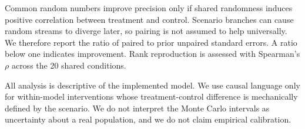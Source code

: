 Common random numbers improve precision only if shared randomness induces positive correlation between treatment and control. Scenario branches can cause random streams to diverge later, so pairing is not assumed to help universally. We therefore report the ratio of paired to prior unpaired standard errors. A ratio below one indicates improvement. Rank reproduction is assessed with Spearman's $\rho$ across the 20 shared conditions.

All analysis is descriptive of the implemented model. We use causal language only for within-model interventions whose treatment-control difference is mechanically defined by the scenario. We do not interpret the Monte Carlo intervals as uncertainty about a real population, and we do not claim empirical calibration.
